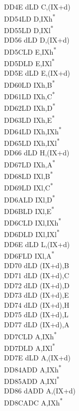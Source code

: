 \documentclass[twoside,openright,a4paper]{book}
\begin{document}
\begin{multicols}{3}
{\begin{tabbing}
	DD4E d\>LD C,(IX+d)\\
	DD54\>LD D,IXh\textsuperscript{*}\\
	DD55\>LD D,IXl\textsuperscript{*}\\
	DD56 d\>LD D,(IX+d)\\
	DD5C\>LD E,IXh\textsuperscript{*}\\
	DD5D\>LD E,IXl\textsuperscript{*}\\
	DD5E d\>LD E,(IX+d)\\
	DD60\>LD IXh,B\textsuperscript{*}\\
	DD61\>LD IXh,C\textsuperscript{*}\\
	DD62\>LD IXh,D\textsuperscript{*}\\
	DD63\>LD IXh,E\textsuperscript{*}\\
	DD64\>LD IXh,IXh\textsuperscript{*}\\
	DD65\>LD IXh,IXl\textsuperscript{*}\\
	DD66 d\>LD H,(IX+d)\\
	DD67\>LD IXh,A\textsuperscript{*}\\
	DD68\>LD IXl,B\textsuperscript{*}\\
	DD69\>LD IXl,C\textsuperscript{*}\\
	DD6A\>LD IXl,D\textsuperscript{*}\\
	DD6B\>LD IXl,E\textsuperscript{*}\\
	DD6C\>LD IXl,IXh\textsuperscript{*}\\
	DD6D\>LD IXl,IXl\textsuperscript{*}\\
	DD6E d\>LD L,(IX+d)\\
	DD6F\>LD IXl,A\textsuperscript{*}\\
	DD70 d\>LD (IX+d),B\\
	DD71 d\>LD (IX+d),C\\
	DD72 d\>LD (IX+d),D\\
	DD73 d\>LD (IX+d),E\\
	DD74 d\>LD (IX+d),H\\
	DD75 d\>LD (IX+d),L\\
	DD77 d\>LD (IX+d),A\\
	DD7C\>LD A,IXh\textsuperscript{*}\\
	DD7D\>LD A,IXl\textsuperscript{*}\\
	DD7E d\>LD A,(IX+d)\\
	DD84\>ADD A,IXh\textsuperscript{*}\\
	DD85\>ADD A,IXl\textsuperscript{*}\\
	DD86 d\>ADD A,(IX+d)\\
	DD8C\>ADC A,IXh\textsuperscript{*}\\

\end{tabbing}}
\end{multicols}
\end{document}
